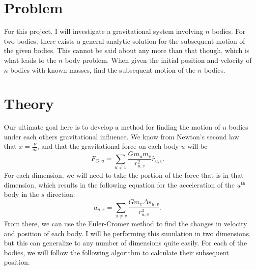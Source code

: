 \documentclass{article}
\begin{document}
\section*{Problem}
For this project, I will investigate a gravitational system involving $n$ bodies. For two bodies, there exists a general analytic solution for the subsequent motion of the given bodies. This cannot be said about any more than that though, which is what leads to the $n$ body problem. When given the initial position and velocity of $n$ bodies with known masses, find the subsequent motion of the $n$ bodies.
	
\section*{Theory}
Our ultimate goal here is to develop a method for finding the motion of $n$ bodies under each others gravitational influence. We know from Newton's second law that $\ddot{x} = \frac{F}{m}$, and that the gravitational force on each body $u$ will be
\[ F_{G,u} = \sum_{u \neq v} \frac{G m_u m_v}{r_{u,v}^2}\hat{r}_{u,v}. \]
For each dimension, we will need to take the portion of the force that is in that dimension, which results in the following equation for the acceleration of the $u^{\text{th}}$ body in the $s$ direction:
\[ a_{u,s} = \sum_{u \neq v} \frac{G m_v \Delta s_{u,v}}{r_{u,v}^3}. \]
From there, we can use the Euler-Cromer method to find the changes in velocity and position of each body. I will be performing this simulation in two dimensions, but this can generalize to any number of dimensions quite easily. For each of the bodies, we will follow the following algorithm to calculate their subsequent position.
\end{document}
